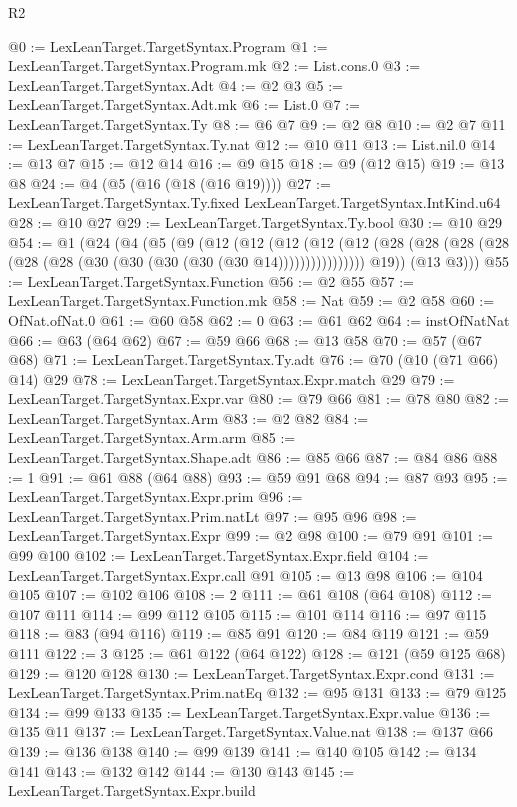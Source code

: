 \begin{lexlean}{R2}
\begin{coremodule}
@0 := LexLeanTarget.TargetSyntax.Program
@1 := LexLeanTarget.TargetSyntax.Program.mk
@2 := List.cons.{0}
@3 := LexLeanTarget.TargetSyntax.Adt
@4 := @2 @3
@5 := LexLeanTarget.TargetSyntax.Adt.mk
@6 := List.{0}
@7 := LexLeanTarget.TargetSyntax.Ty
@8 := @6 @7
@9 := @2 @8
@10 := @2 @7
@11 := LexLeanTarget.TargetSyntax.Ty.nat
@12 := @10 @11
@13 := List.nil.{0}
@14 := @13 @7
@15 := @12 @14
@16 := @9 @15
@18 := @9 (@12 @15)
@19 := @13 @8
@24 := @4 (@5 (@16 (@18 (@16 @19))))
@27 := LexLeanTarget.TargetSyntax.Ty.fixed LexLeanTarget.TargetSyntax.IntKind.u64
@28 := @10 @27
@29 := LexLeanTarget.TargetSyntax.Ty.bool
@30 := @10 @29
@54 := @1
    (@24
      (@4
        (@5
          (@9
            (@12
              (@12
                (@12
                  (@12
                    (@12 (@28 (@28 (@28 (@28 (@28 (@28 (@30 (@30 (@30 (@30 (@30 @14))))))))))))))))
            @19))
        (@13 @3)))
@55 := LexLeanTarget.TargetSyntax.Function
@56 := @2 @55
@57 := LexLeanTarget.TargetSyntax.Function.mk
@58 := Nat
@59 := @2 @58
@60 := OfNat.ofNat.{0}
@61 := @60 @58
@62 := 0
@63 := @61 @62
@64 := instOfNatNat
@66 := @63 (@64 @62)
@67 := @59 @66
@68 := @13 @58
@70 := @57 (@67 @68)
@71 := LexLeanTarget.TargetSyntax.Ty.adt
@76 := @70 (@10 (@71 @66) @14) @29
@78 := LexLeanTarget.TargetSyntax.Expr.match @29
@79 := LexLeanTarget.TargetSyntax.Expr.var
@80 := @79 @66
@81 := @78 @80
@82 := LexLeanTarget.TargetSyntax.Arm
@83 := @2 @82
@84 := LexLeanTarget.TargetSyntax.Arm.arm
@85 := LexLeanTarget.TargetSyntax.Shape.adt
@86 := @85 @66
@87 := @84 @86
@88 := 1
@91 := @61 @88 (@64 @88)
@93 := @59 @91 @68
@94 := @87 @93
@95 := LexLeanTarget.TargetSyntax.Expr.prim
@96 := LexLeanTarget.TargetSyntax.Prim.natLt
@97 := @95 @96
@98 := LexLeanTarget.TargetSyntax.Expr
@99 := @2 @98
@100 := @79 @91
@101 := @99 @100
@102 := LexLeanTarget.TargetSyntax.Expr.field
@104 := LexLeanTarget.TargetSyntax.Expr.call @91
@105 := @13 @98
@106 := @104 @105
@107 := @102 @106
@108 := 2
@111 := @61 @108 (@64 @108)
@112 := @107 @111
@114 := @99 @112 @105
@115 := @101 @114
@116 := @97 @115
@118 := @83 (@94 @116)
@119 := @85 @91
@120 := @84 @119
@121 := @59 @111
@122 := 3
@125 := @61 @122 (@64 @122)
@128 := @121 (@59 @125 @68)
@129 := @120 @128
@130 := LexLeanTarget.TargetSyntax.Expr.cond
@131 := LexLeanTarget.TargetSyntax.Prim.natEq
@132 := @95 @131
@133 := @79 @125
@134 := @99 @133
@135 := LexLeanTarget.TargetSyntax.Expr.value
@136 := @135 @11
@137 := LexLeanTarget.TargetSyntax.Value.nat
@138 := @137 @66
@139 := @136 @138
@140 := @99 @139
@141 := @140 @105
@142 := @134 @141
@143 := @132 @142
@144 := @130 @143
@145 := LexLeanTarget.TargetSyntax.Expr.build

\end{coremodule}
\end{lexlean}
